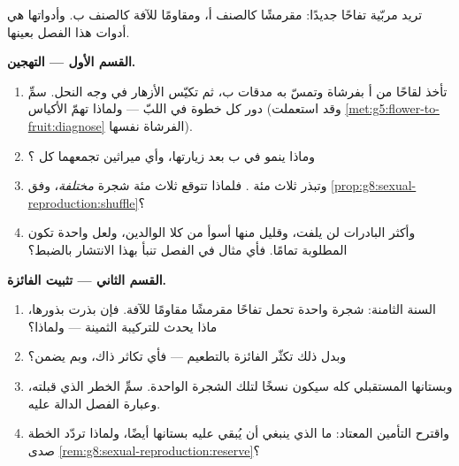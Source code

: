 \begin{problem}\label{pb:g8:sexual-reproduction:1}
تريد مربّية تفاحًا جديدًا: مقرمشًا كالصنف أ، ومقاومًا للآفة كالصنف
ب. وأدواتها هي أدوات هذا الفصل بعينها.

\medskip\noindent\textbf{القسم الأول --- التهجين.}
\begin{enumerate}
  \item تأخذ لقاحًا من  أ بفرشاة وتمسّ به مدقات ب، ثم تكيّس
        الأزهار في وجه النحل. سمِّ دور كل خطوة في اللبّ ---
        ولماذا تهمّ الأكياس
        (وقد استعملت \cref{met:g5:flower-to-fruit:diagnose}
        الفرشاة نفسها).
  \item وماذا ينمو في  ب بعد زيارتها، وأي ميراثين تجمعهما كل
        ؟
  \item وتبذر ثلاث مئة . فلماذا تتوقع ثلاث مئة شجرة
        \emph{مختلفة}، وفق
        \cref{prop:g8:sexual-reproduction:shuffle}؟
  \item وأكثر البادرات لن يلفت، وقليل منها أسوأ من كلا الوالدين،
        ولعل واحدة تكون المطلوبة تمامًا. فأي مثال في الفصل تنبأ
        بهذا الانتشار بالضبط؟
\end{enumerate}

\medskip\noindent\textbf{القسم الثاني --- تثبيت الفائزة.}
\begin{enumerate}[resume]
  \item السنة الثامنة: شجرة واحدة تحمل تفاحًا مقرمشًا مقاومًا
        للآفة. فإن بذرت بذورها، ماذا يحدث للتركيبة الثمينة ---
        ولماذا؟
  \item وبدل ذلك تكثّر الفائزة بالتطعيم --- فأي تكاثر ذاك، وبم
        يضمن؟
  \item وبستانها المستقبلي كله سيكون نسخًا لتلك الشجرة الواحدة.
        سمِّ الخطر الذي قبلته، وعبارة الفصل الدالة عليه.
  \item واقترح التأمين المعتاد: ما الذي ينبغي أن يُبقي عليه
        بستانها أيضًا، ولماذا تردّد الخطة صدى
        \cref{rem:g8:sexual-reproduction:reserve}؟
\end{enumerate}


\end{problem}
